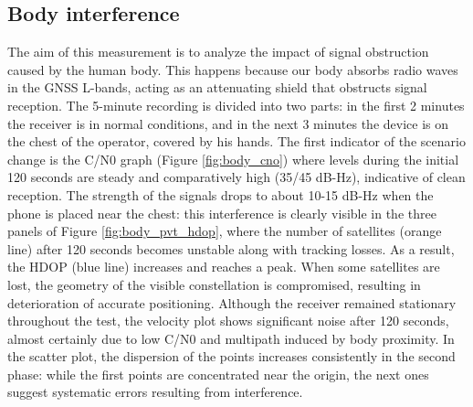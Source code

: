 \subsection{Body interference}
The aim of this measurement is to analyze the impact of signal obstruction caused by the human body. This happens because our body absorbs radio waves in the GNSS L-bands, acting as an attenuating shield that obstructs signal reception. The 5-minute recording is divided into two parts: in the first 2 minutes the receiver is in normal conditions, and in the next 3 minutes the device is on the chest of the operator, covered by his hands. The first indicator of the scenario change is the C/N0 graph (Figure \ref{fig:body_cno}) where levels during the initial 120 seconds are steady and comparatively high (35/45 dB-Hz), indicative of clean reception. The strength of the signals drops to about 10-15 dB-Hz when the phone is placed near the chest: this interference is clearly visible in the three panels of Figure \ref{fig:body_pvt_hdop}, where the number of satellites (orange line) after 120 seconds becomes unstable along with tracking losses. As a result, the HDOP (blue line) increases and reaches a peak. When some satellites are lost, the geometry of the visible constellation is compromised, resulting in deterioration of accurate positioning. Although the receiver remained stationary throughout the test, the velocity plot shows significant noise after 120 seconds, almost certainly due to low C/N0 and multipath induced by body proximity. In the scatter plot, the dispersion of the points increases consistently in the second phase: while the first points are concentrated near the origin, the next ones suggest systematic errors resulting from interference.

